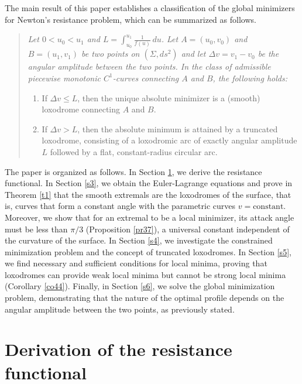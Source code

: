 \documentclass[a4paper,12pt]{amsart}
\theoremstyle{definition}
\begin{document}
The main result of this paper establishes a   classification of the global minimizers for  Newton's resistance problem, which can be summarized as follows. 
 

\begin{quote}
 {\it Let  $0<u_0<u_1$ and $L=\int_{u_0}^{u_1}\frac{1}{f(u)}\, du$. Let $A=(u_0, v_0)$ and $B=(u_1, v_1)$ be two points  on $(\Sigma,ds^2)$  and let $\Delta v = v_1 - v_0$ be the angular amplitude between the two points. In the class of admissible piecewise monotonic $C^1$-curves  connecting $A$ and $B$, the following holds:

\begin{enumerate}
    \item  If $\Delta v \le L$, then the unique absolute minimizer is a (smooth) loxodrome connecting $A$ and $B$. 
        \item If $\Delta v > L$, then  the absolute minimum is attained by a truncated loxodrome, consisting of a loxodromic arc of exactly angular amplitude $L$ followed by a flat, constant-radius circular arc.
\end{enumerate}}
\end{quote}

 

The paper is organized as follows. In Section \ref{s2}, we derive the resistance functional. 
In Section \ref{s3}, we obtain the Euler-Lagrange equations and prove in Theorem \ref{t1}
 that the smooth extremals are the loxodromes of the surface, that is, curves that form a constant angle with the parametric curves $v=\text{constant}$. Moreover, we show that 
 for an extremal to be a local minimizer, its attack angle must be less than $\pi/3$ (Proposition \ref{pr37}), 
 a universal constant independent of the   curvature of the surface. In Section \ref{s4}, we investigate the constrained minimization problem and the concept of truncated loxodromes.  In Section \ref{s5}, we find  necessary and sufficient conditions for local minima, proving that loxodromes can provide weak local minima but cannot be strong local minima (Corollary \ref{co44}).   Finally, in Section \ref{s6}, we   solve the global minimization problem, demonstrating that the nature of the optimal profile depends   on the angular amplitude between the two points,   as previously  stated.  

\section{Derivation of the resistance functional}\label{s2}
\end{document}
